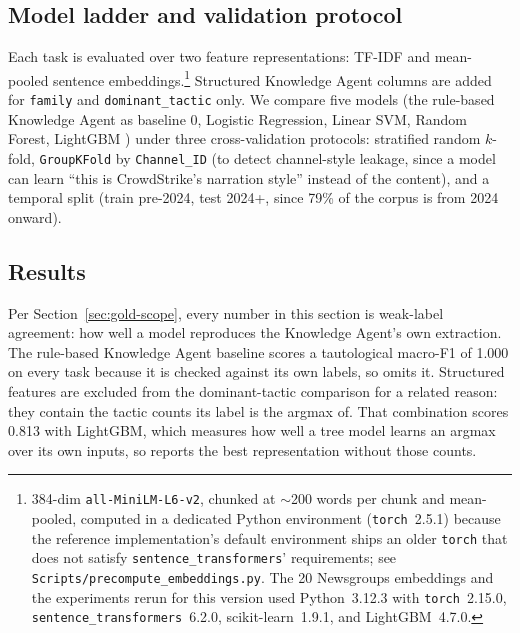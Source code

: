 \documentclass[preprint,12pt]{elsarticle}
\begin{document}
\subsection{Model ladder and validation protocol}
Each task is evaluated over two feature representations: TF-IDF and
mean-pooled sentence embeddings.\footnote{384-dim
  \texttt{all-MiniLM-L6-v2}, chunked at $\sim$200 words per chunk and
  mean-pooled, computed in a dedicated Python environment
  (\texttt{torch}~2.5.1) because the reference implementation's default
  environment ships an older \texttt{torch} that does not satisfy
  \texttt{sentence\_transformers}' \citep{reimers2019sbert} requirements; see
  \texttt{Scripts/precompute\_embeddings.py}. The 20 Newsgroups embeddings
  and the experiments rerun for this version used Python~3.12.3 with
  \texttt{torch}~2.15.0, \texttt{sentence\_transformers}~6.2.0,
  scikit-learn~1.9.1, and LightGBM~4.7.0.} Structured Knowledge Agent
columns are added for \texttt{family} and \texttt{dominant\_tactic} only. We
compare five models (the rule-based Knowledge Agent as baseline 0, Logistic
Regression, Linear SVM, Random Forest, LightGBM \citep{ke2017lightgbm}) under
three cross-validation protocols: stratified random $k$-fold,
\texttt{GroupKFold} by \texttt{Channel\_ID} (to detect channel-style leakage,
since a model can learn ``this is CrowdStrike's narration style'' instead of
the content), and a temporal split (train pre-2024, test 2024+, since 79\% of
the corpus is from 2024 onward).

\subsection{Results}
\label{sec:baseline-results}
Per Section~\ref{sec:gold-scope}, every number in this section is
weak-label agreement: how well a model reproduces the Knowledge Agent's own
extraction. The rule-based Knowledge Agent baseline scores a tautological
macro-F1 of 1.000 on every task because it is checked against its own labels,
so  omits it. Structured features are excluded from the
dominant-tactic comparison for a related reason: they contain the tactic
counts its label is the argmax of. That combination scores 0.813 with
LightGBM, which measures how well a tree model learns an argmax over its own
inputs, so  reports the best representation without those
counts.
\end{document}
